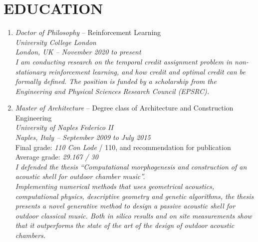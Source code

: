 \section*{EDUCATION}
    \begin{enumerate}[leftmargin=0.45cm, itemsep=1em, topsep=0.5em, parsep=0.2em]
        \item
        \emph{Doctor of Philosophy} -- Reinforcement Learning \\
        \emph{University College London} \\
        \textit{London, UK -- November 2020 to \emph{present}} \\
        \textit{I am conducting research on the temporal credit assignment problem in non-stationary reinforcement learning, and how \textit{credit} and \textit{optimal credit} can be formally defined. The position is funded by a scholarship from the Engineering and Physical Sciences Research Council (EPSRC).}
        \item
        \emph{Master of Architecture} -- Degree class of Architecture and Construction Engineering \\
        \emph{University of Naples Federico II} \\
        \textit{Naples, Italy -- September 2009 to July 2015} \\
        Final grade: \emph{110 Con Lode} / 110, and recommendation for publication \\
        Average grade: \emph{29.167 / 30} \\
        \textit{I defended the thesis “Computational morphogenesis and construction of an acoustic shell for outdoor chamber music”. \\Implementing numerical methods that uses geometrical acoustics, computational physics, descriptive geometry and genetic algorithms, the thesis presents a novel generative method to design a passive acoustic shell for outdoor classical music. Both in silico results and on site measurements show that it outperforms the state of the art of the design of outdoor acoustic chambers.}
    \end{enumerate}
